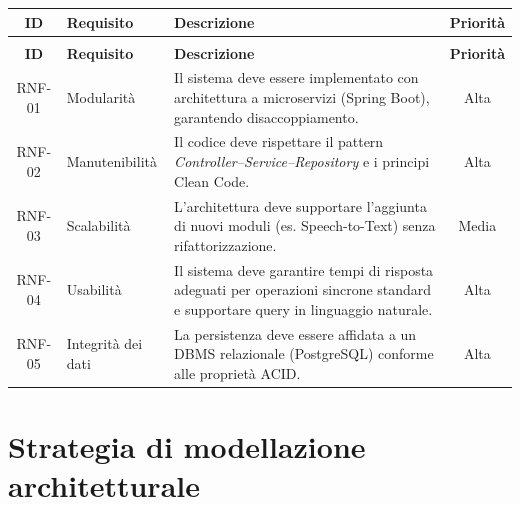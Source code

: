 \begin{small}
    \begin{longtable}{|c|p{4cm}|p{6cm}|c|}

        \hline
        \textbf{ID} & \textbf{Requisito} & \textbf{Descrizione}                                                                                                             & \textbf{Priorità} \\ \hline
        \endfirsthead

        \multicolumn{4}{c}{}                                                                                                                                                                    \\
        \hline
        \textbf{ID} & \textbf{Requisito} & \textbf{Descrizione}                                                                                                             & \textbf{Priorità} \\ \hline
        \endhead

        \hline
        \endfoot

        RNF-01      & Modularità         & Il sistema deve essere implementato con architettura a microservizi (Spring Boot), garantendo disaccoppiamento.                  & Alta              \\ \hline
        RNF-02      & Manutenibilità     & Il codice deve rispettare il pattern \textit{Controller–Service–Repository} e i principi Clean Code.                             & Alta              \\ \hline
        RNF-03      & Scalabilità        & L'architettura deve supportare l'aggiunta di nuovi moduli (es. Speech-to-Text) senza rifattorizzazione.                          & Media             \\ \hline
        RNF-04      & Usabilità          & Il sistema deve garantire tempi di risposta adeguati per operazioni sincrone standard e supportare query in linguaggio naturale. & Alta              \\ \hline
        RNF-05      & Integrità dei dati & La persistenza deve essere affidata a un DBMS relazionale (PostgreSQL) conforme alle proprietà ACID.                             & Alta              \\ \hline
    \end{longtable}
\end{small}

\newpage
\section{Strategia di modellazione architetturale}

